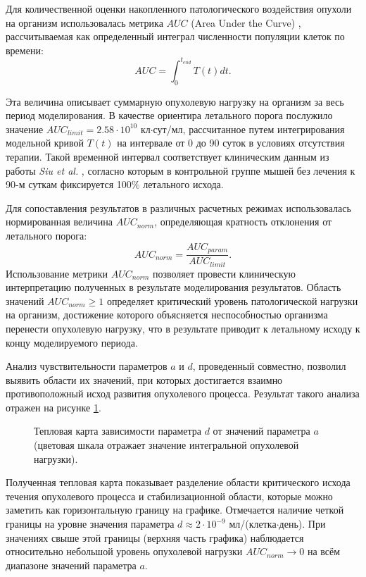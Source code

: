 Для количественной оценки накопленного патологического воздействия опухоли на
организм использовалась метрика $AUC$ (Area Under the Curve)
\cite{auc_metric_pharm}, рассчитываемая как определенный интеграл численности
популяции клеток по времени:
\begin{equation}
  AUC = \int_{0}^{t_{end}} T(t) dt.
\end{equation}

Эта величина описывает суммарную опухолевую нагрузку на организм за весь период
моделирования. В качестве ориентира летального порога послужило значение
$AUC_{limit} = 2.58 \cdot 10^{10}$ кл$\cdot$сут/мл, рассчитанное путем интегрирования
модельной кривой $T(t)$ на интервале от 0 до 90 суток в условиях отсутствия
терапии. Такой временной интервал соответствует клиническим данным из работы
\textit{Siu et al.} \cite{Siu1986}, согласно которым в контрольной группе мышей без
лечения к 90-м суткам фиксируется 100\% летального исхода.

Для сопоставления результатов в различных расчетных режимах использовалась
нормированная величина $AUC_{norm}$, определяющая кратность отклонения от
летального порога:
\begin{equation}
  AUC_{norm} = \frac{AUC_{param}}{AUC_{limit}}.
\end{equation}
Использование метрики $AUC_{norm}$ позволяет провести клиническую интерпретацию
полученных в результате моделирования результатов. Область значений $AUC_{norm}
\ge 1$ определяет критический уровень патологической нагрузки на организм,
достижение которого объясняется неспособностью организма перенести опухолевую
нагрузку, что в результате приводит к летальному исходу к концу моделируемого периода.

Анализ чувствительности параметров $a$ и $d$, проведенный совместно, позволил
выявить области их значений, при которых достигается взаимно противоположный
исход развития опухолевого процесса. Результат такого анализа отражен на
рисунке \ref{fig:heatmap}.

\begin{figure}[ht!]
  \centering
  
  \caption{Тепловая карта зависимости параметра $d$ от значений параметра
  $a$ (цветовая шкала отражает значение интегральной опухолевой нагрузки).}
  \label{fig:heatmap}
\end{figure}

Полученная тепловая карта показывает разделение области критического исхода
течения опухолевого процесса и стабилизационной области, которые можно
заметить как горизонтальную границу на графике. Отмечается наличие четкой границы
на уровне значения параметра $d \approx 2 \cdot 10^{-9}$ мл/(клетка$\cdot$день).
При значениях свыше этой границы (верхняя часть графика) наблюдается
относительно небольшой уровень опухолевой нагрузки $AUC_{norm} \to 0$ на всём
диапазоне значений параметра $a$.

